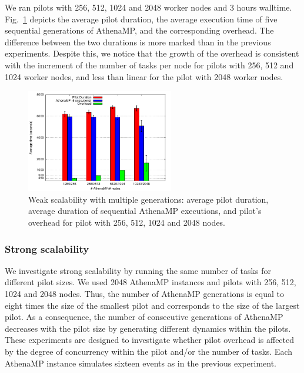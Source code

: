 We ran pilots with 256, 512, 1024 and 2048 worker nodes and 3
hours walltime. Fig.~\ref{fig:weakScal2a} depicts the average pilot duration,
the average execution time of five sequential generations of AthenaMP, and
the corresponding overhead. The difference between the two durations is more
marked than in the previous experiments. Despite this, we notice that the
growth of the overhead is consistent with the increment of the number of
tasks per node for pilots with 256, 512 and 1024 worker nodes, and less than
linear for the pilot with 2048 worker nodes.

\begin{figure}[!t]
        \includegraphics[height=4.5cm,width=\columnwidth]{./figures/NGE/weak2.pdf}
        \vspace{-0.3in}
    \caption{Weak scalability with multiple generations: average pilot
    duration, average duration of sequential AthenaMP executions, and
    pilot's overhead for pilot with 256, 512, 1024 and 2048 nodes.}
\label{fig:weakScal2a}
\end{figure}


\subsubsection{Strong scalability}

We investigate strong scalability by running the same number of tasks for
different pilot sizes. We used 2048 AthenaMP instances and pilots with 256,
512, 1024 and 2048 nodes. Thus, the number of AthenaMP generations is equal
to eight times the size of the smallest pilot and corresponds to the size of
the largest pilot. As a consequence, the number of consecutive generations of
AthenaMP decreases with the pilot size by generating different dynamics
within the pilots. These experiments are designed to investigate whether
pilot overhead is affected by the degree of concurrency within the pilot
and/or the number of tasks. Each AthenaMP instance simulates sixteen events
as in the previous experiment.

